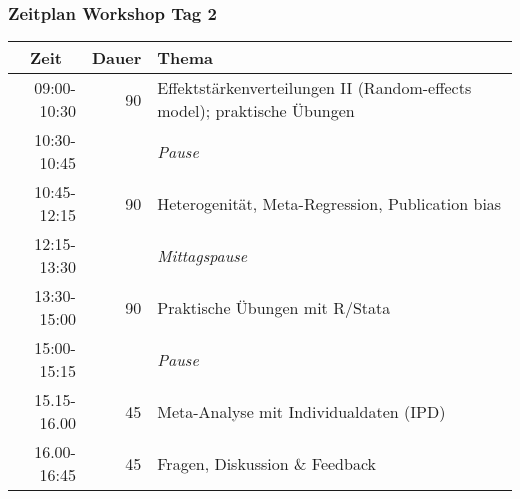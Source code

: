 \documentclass[%
handout%
]{beamer}\usepackage{graphicx, color}
\begin{document}
\begin{frame}
  \frametitle{Zeitplan Workshop Tag 2}
  \begin{center}
    \begin{tabularx}{\linewidth}{@{}rr>{\raggedright\arraybackslash}X@{}}
      \toprule
      \multicolumn{1}{c}{Zeit}  &  Dauer  &  Thema                                                                    \\
      \midrule
      09:00-10:30  &     90  &  Effektstärkenverteilungen II (Random-effects model); praktische Übungen  \\
      10:30-10:45  &         &  \emph{Pause}                                                             \\
      10:45-12:15  &     90  &  Heterogenität, Meta-Regression, Publication bias                         \\
      12:15-13:30  &         &  \emph{Mittagspause}                                                      \\
      13:30-15:00  &     90  &  Praktische Übungen mit R/Stata                                           \\
      15:00-15:15  &         &  \emph{Pause}                                                             \\
      15.15-16.00  &     45  &  Meta-Analyse mit Individualdaten (IPD)                                   \\
      16.00-16:45  &     45  &  Fragen, Diskussion \& Feedback                                           \\
      \bottomrule
    \end{tabularx}
  \end{center}
\end{frame}
\end{document}
